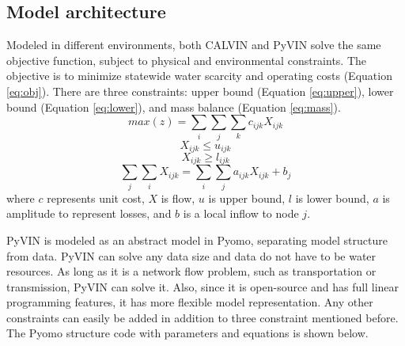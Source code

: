 \documentclass[12pt]{article}%
\begin{document}
\subsection{Model architecture}
%
Modeled in different environments, both CALVIN and PyVIN solve the same objective function, subject to physical and environmental constraints. The objective is to minimize statewide water scarcity and operating costs (Equation \ref{eq:obj}). There are three constraints: upper bound (Equation \ref{eq:upper}), lower bound (Equation \ref{eq:lower}), and mass balance (Equation \ref{eq:mass}).
%
\begin{equation} \label{eq:obj}
max (z) = \sum_{i}\sum_{j}\sum_{k} c_{ijk}X_{ijk}
\end{equation}
%
\begin{equation} \label{eq:upper}
X_{ijk} \leq u_{ijk}
\end{equation}
%
\begin{equation} \label{eq:lower}
X_{ijk} \geq l_{ijk}
\end{equation}
%
\begin{equation} \label{eq:mass}
\sum_{j}\sum_{i} X_{ijk} = \sum_{i}\sum_{j} a_{ijk}X_{ijk} + b_j
\end{equation}
%
where $c$ represents unit cost, $X$ is flow, $u$ is upper bound, $l$ is lower bound, $a$ is amplitude to represent losses, and $b$ is a local inflow to node $j$.
\par PyVIN is modeled as an abstract model in Pyomo, separating model structure from data. PyVIN can solve any data size and data do not have to be water resources. As long as it is a network flow problem, such as transportation or transmission, PyVIN can solve it. Also, since it is open-source and has full linear programming features, it has more flexible model representation. Any other constraints can easily be added in addition to three constraint mentioned before. The Pyomo structure code with parameters and equations is shown below.
%
\end{document}
